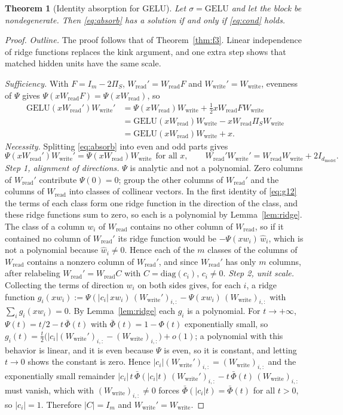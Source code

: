 \documentclass[10pt]{article}
\newtheorem{theorem}{Theorem}
\theoremstyle{definition}
\theoremstyle{remark}
\newcommand{\Wread}{W_{\mathrm{read}}}
\newcommand{\Wwrite}{W_{\mathrm{write}}}
\newcommand{\dm}{d_{\mathrm{model}}}
\begin{document}
\begin{theorem}[Identity absorption for GELU]\label{thm:f4}
Let $\sigma = \mathrm{GELU}$ and let the block be nondegenerate. Then \eqref{eq:absorb} has a solution if and only if \eqref{eq:cond} holds.
\end{theorem}
\begin{proof}
\emph{Outline.} The proof follows that of Theorem~\ref{thm:f3}. Linear independence of ridge functions replaces the kink argument, and one extra step shows that matched hidden units have the same scale.

\emph{Sufficiency.} With $F = I_m - 2\Pi_S$, $\Wread' = \Wread F$ and $\Wwrite' = \Wwrite$, evenness of $\Psi$ gives $\Psi(x\Wread F) = \Psi(x\Wread)$, so
\begin{align*}
\mathrm{GELU}(x\Wread')\Wwrite' &= \Psi(x\Wread)\Wwrite + \tfrac12 x\Wread F\Wwrite \\
&= \mathrm{GELU}(x\Wread)\Wwrite - x\Wread\Pi_S\Wwrite \\
&= \mathrm{GELU}(x\Wread)\Wwrite + x .
\end{align*}
\emph{Necessity.} Splitting \eqref{eq:absorb} into even and odd parts gives
\begin{equation}\label{eq:g12}
\Psi(x\Wread')\Wwrite' = \Psi(x\Wread)\Wwrite\ \ \text{for all } x,\qquad \Wread'\Wwrite' = \Wread\Wwrite + 2I_{\dm} .
\end{equation}
\emph{Step 1, alignment of directions.} $\Psi$ is analytic and not a polynomial. Zero columns of $\Wread'$ contribute $\Psi(0) = 0$; group the other columns of $\Wread'$ and the columns of $\Wread$ into classes of collinear vectors. In the first identity of \eqref{eq:g12} the terms of each class form one ridge function in the direction of the class, and these ridge functions sum to zero, so each is a polynomial by Lemma~\ref{lem:ridge}. The class of a column $w_i$ of $\Wread$ contains no other column of $\Wread$, so if it contained no column of $\Wread'$ its ridge function would be $-\Psi(x w_i)\,\hat w_i$, which is not a polynomial because $\hat w_i \neq 0$. Hence each of the $m$ classes of the columns of $\Wread$ contains a nonzero column of $\Wread'$, and since $\Wread'$ has only $m$ columns, after relabeling $\Wread' = \Wread C$ with $C = \mathrm{diag}(c_i)$, $c_i \neq 0$.
\emph{Step 2, unit scale.} Collecting the terms of direction $w_i$ on both sides gives, for each $i$, a ridge function $g_i(x w_i) := \Psi(|c_i|\,x w_i)\,(\Wwrite')_{i,:} - \Psi(x w_i)\,(\Wwrite)_{i,:}$ with $\sum_i g_i(x w_i) = 0$. By Lemma~\ref{lem:ridge} each $g_i$ is a polynomial. For $t \to +\infty$, $\Psi(t) = t/2 - t\,\bar\Phi(t)$ with $\bar\Phi(t) = 1 - \Phi(t)$ exponentially small, so $g_i(t) = \tfrac{t}{2}\big(|c_i|(\Wwrite')_{i,:} - (\Wwrite)_{i,:}\big) + o(1)$; a polynomial with this behavior is linear, and it is even because $\Psi$ is even, so it is constant, and letting $t \to 0$ shows the constant is zero. Hence $|c_i|(\Wwrite')_{i,:} = (\Wwrite)_{i,:}$ and the exponentially small remainder $|c_i|\,t\,\bar\Phi(|c_i|t)\,(\Wwrite')_{i,:} - t\,\bar\Phi(t)\,(\Wwrite)_{i,:}$ must vanish, which with $(\Wwrite)_{i,:} \neq 0$ forces $\bar\Phi(|c_i|t) = \bar\Phi(t)$ for all $t > 0$, so $|c_i| = 1$. Therefore $|C| = I_m$ and $\Wwrite' = \Wwrite$.

\end{proof}
\end{document}
